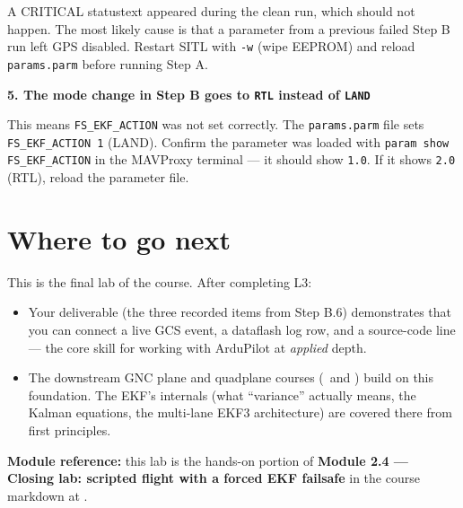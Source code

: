 \documentclass[a4paper,11pt,twoside]{article}
\begin{document}
A CRITICAL statustext appeared during the clean run, which should not happen. The most likely cause is that a parameter from a previous failed Step B run left GPS disabled. Restart SITL with \texttt{-w} (wipe EEPROM) and reload \texttt{params.parm} before running Step A.

\textbf{5. The mode change in Step B goes to \texttt{RTL} instead of \texttt{LAND}}

This means \texttt{FS\_EKF\_ACTION} was not set correctly. The \texttt{params.parm} file sets \texttt{FS\_EKF\_ACTION 1} (LAND). Confirm the parameter was loaded with \texttt{param show FS\_EKF\_ACTION} in the MAVProxy terminal --- it should show \texttt{1.0}. If it shows \texttt{2.0} (RTL), reload the parameter file.

\section*{Where to go next}

This is the final lab of the course. After completing L3:
\begin{itemize}
  \item Your deliverable (the three recorded items from Step B.6) demonstrates that you can connect a live GCS event, a dataflash log row, and a source-code line --- the core skill for working with ArduPilot at \emph{applied} depth.
  \item The downstream GNC plane and quadplane courses (\siblingplane\ and \siblingquadplane) build on this foundation. The EKF's internals (what ``variance'' actually means, the Kalman equations, the multi-lane EKF3 architecture) are covered there from first principles.
\end{itemize}

\textbf{Module reference:} this lab is the hands-on portion of \textbf{Module 2.4 --- Closing lab: scripted flight with a forced EKF failsafe} in the course markdown at .

\fi
\end{document}
